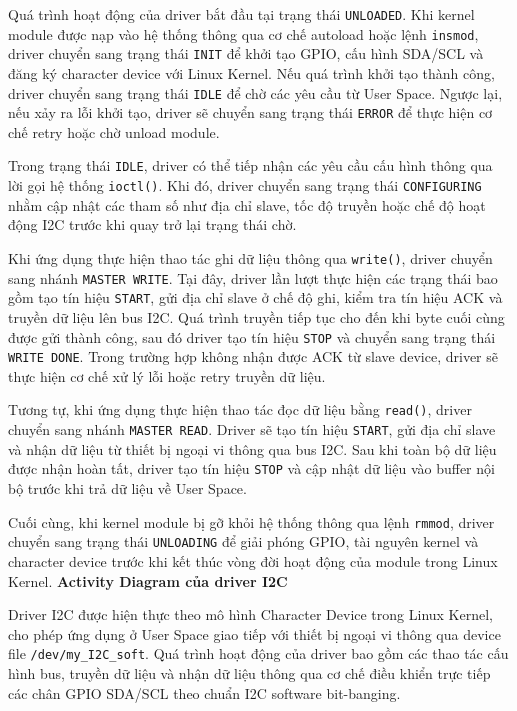 Quá trình hoạt động của driver bắt đầu tại trạng thái \texttt{UNLOADED}. Khi kernel module được nạp vào hệ thống thông qua cơ chế autoload hoặc lệnh \texttt{insmod}, driver chuyển sang trạng thái \texttt{INIT} để khởi tạo GPIO, cấu hình SDA/SCL và đăng ký character device với Linux Kernel. Nếu quá trình khởi tạo thành công, driver chuyển sang trạng thái \texttt{IDLE} để chờ các yêu cầu từ User Space. Ngược lại, nếu xảy ra lỗi khởi tạo, driver sẽ chuyển sang trạng thái \texttt{ERROR} để thực hiện cơ chế retry hoặc chờ unload module.

Trong trạng thái \texttt{IDLE}, driver có thể tiếp nhận các yêu cầu cấu hình thông qua lời gọi hệ thống \texttt{ioctl()}. Khi đó, driver chuyển sang trạng thái \texttt{CONFIGURING} nhằm cập nhật các tham số như địa chỉ slave, tốc độ truyền hoặc chế độ hoạt động I2C trước khi quay trở lại trạng thái chờ.

Khi ứng dụng thực hiện thao tác ghi dữ liệu thông qua \texttt{write()}, driver chuyển sang nhánh \texttt{MASTER WRITE}. Tại đây, driver lần lượt thực hiện các trạng thái bao gồm tạo tín hiệu \texttt{START}, gửi địa chỉ slave ở chế độ ghi, kiểm tra tín hiệu ACK và truyền dữ liệu lên bus I2C. Quá trình truyền tiếp tục cho đến khi byte cuối cùng được gửi thành công, sau đó driver tạo tín hiệu \texttt{STOP} và chuyển sang trạng thái \texttt{WRITE DONE}. Trong trường hợp không nhận được ACK từ slave device, driver sẽ thực hiện cơ chế xử lý lỗi hoặc retry truyền dữ liệu.

Tương tự, khi ứng dụng thực hiện thao tác đọc dữ liệu bằng \texttt{read()}, driver chuyển sang nhánh \texttt{MASTER READ}. Driver sẽ tạo tín hiệu \texttt{START}, gửi địa chỉ slave và nhận dữ liệu từ thiết bị ngoại vi thông qua bus I2C. Sau khi toàn bộ dữ liệu được nhận hoàn tất, driver tạo tín hiệu \texttt{STOP} và cập nhật dữ liệu vào buffer nội bộ trước khi trả dữ liệu về User Space.

Cuối cùng, khi kernel module bị gỡ khỏi hệ thống thông qua lệnh \texttt{rmmod}, driver chuyển sang trạng thái \texttt{UNLOADING} để giải phóng GPIO, tài nguyên kernel và character device trước khi kết thúc vòng đời hoạt động của module trong Linux Kernel.
\noindent \textbf{Activity Diagram của driver I2C}

Driver I2C được hiện thực theo mô hình Character Device trong Linux Kernel, cho phép ứng dụng ở User Space giao tiếp với thiết bị ngoại vi thông qua device file \texttt{/dev/my\_I2C\_soft}. Quá trình hoạt động của driver bao gồm các thao tác cấu hình bus, truyền dữ liệu và nhận dữ liệu thông qua cơ chế điều khiển trực tiếp các chân GPIO SDA/SCL theo chuẩn I2C software bit-banging.

